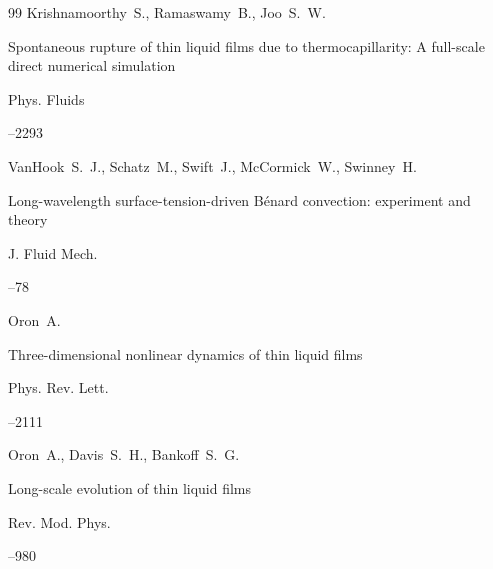\begin{thebibliography}{99}
\by Krishnamoorthy~S., Ramaswamy~B., Joo~S.~W.

\paper  Spontaneous rupture of thin liquid films due to thermocapillarity: A full-scale direct numerical simulation 

\jour Phys. Fluids




--2293





\by VanHook~S.~J., Schatz~M., Swift~J., McCormick~W., Swinney~H. 

\paper Long-wavelength surface-tension-driven B\'enard convection: experiment and theory

\jour J. Fluid Mech.



--78





\by Oron~A.

\paper Three-dimensional nonlinear dynamics of thin liquid films

\jour Phys. Rev. Lett.




--2111







\by Oron~A., Davis~S.~H., Bankoff~S.~G.

\paper Long-scale evolution of thin liquid films

\jour Rev. Mod. Phys.




--980






\end{thebibliography}
